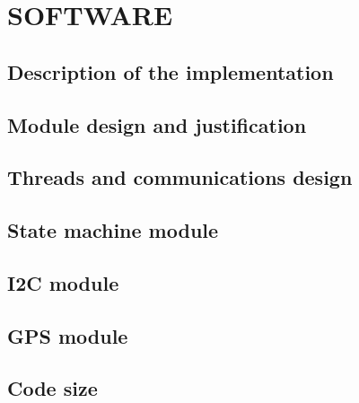 \section{SOFTWARE}

\subsection{Description of the implementation}

\subsection{Module design and justification}

\subsection{Threads and communications design}

\subsection{State machine module}

\subsection{I2C module}

\subsection{GPS module}

\subsection{Code size}